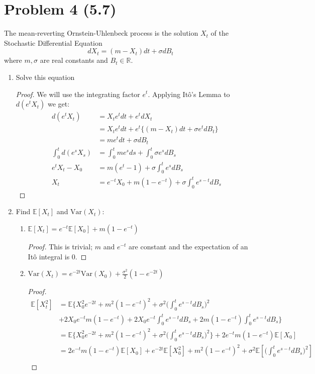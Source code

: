 \documentclass[11pt]{article}
\newcommand{\bbr}{\mathbb{R}}
\newcommand{\var}{\mrm{Var}}
\newcommand{\gs}{\sigma}
\newcommand{\mrm}{\mathrm}
\newcommand{\E}{\mathbb{E}}
\begin{document}
 \section*{Problem 4 (5.7)}
 The mean-reverting Ornstein-Uhlenbeck process is the solution $X_t$ of the Stochastic Differential Equation $$ d X _ { t } = \left( m - X _ { t } \right) d t + \sigma d B _ { t }$$ where $m,\gs$ are real constants and $B_t \in \bbr$.
 \begin{enumerate}
 \item Solve this equation
 \begin{proof}
We will use the integrating factor $e^t$.  Applying It\^o's Lemma to $d(e^{t}X_t)$ we get:
\begin{align*}
d(e^t X_t) &= X_t e^t dt + e^t dX_t\\
&= X_t e^t dt + e^t \Big\{ (m-X_t)dt + \gs e^t dB_t\Big\}\\
&= me^t  dt + \gs dB_t \\
\int_0^t d(e^s X_s) &= \int_0^t me^s ds + \int_0^t \gs e^s dB_s\\
e^t X_t -X_0 &= m (e^t -1) + \gs \int_0^t e^s dB_s\\
X_t &= e^{-t} X_0 + m(1-e^{-t}) + \gs \int_0^t e^{s-t} dB_s
\end{align*}
 \end{proof}
 \item  Find $\E [X_t]$ and $\var(X_t)$:
 \begin{enumerate}
 \item $\E[X_t]= e^{-t} \E[X_0] + m(1-e^{-t})$ 
 \begin{proof}
 This is trivial; $m$ and $e^{-t}$ are constant and the expectation of an It\^o integral is $0$.
 \end{proof}
 \item $\var (X_t)= e^{-2t} \var (X_0) + \frac{\gs^2}{2}(1-e^{-2t})$
 \begin{proof}
 \begin{align*}
 \E[X_t^2] &= \E \Big\{ X_0^2 e^{-2t} +m^2(1-e^{-t})^2+\gs^2 \big( \int_0^t e^{s-t} dB_s \big)^2\\ &+ 2 X_0 e^{-t}m(1-e^{-t}) + 2 X_0 e^{-t}\int_0^t e^{s-t} dB_s+ 2 m(1-e^{-t}) \int_0^t e^{s-t} dB_s \Big\}\\
 &= \E \Big\{ X_0^2 e^{-2t} +m^2(1-e^{-t})^2+\gs^2 \big( \int_0^t e^{s-t} dB_s \big)^2 \Big\} + 2 e^{-t}m(1-e^{-t}) \E[X_0] \\
 &= 2 e^{-t}m(1-e^{-t}) \E[X_0] + e^{-2t}\E[X_0^2]+m^2(1-e^{-t})^2 + \gs^2 \E[ \big( \int_0^t e^{s-t} dB_s \big)^2]\\

\end{align*}
\end{proof}
\end{enumerate}
\end{enumerate}
\end{document}
